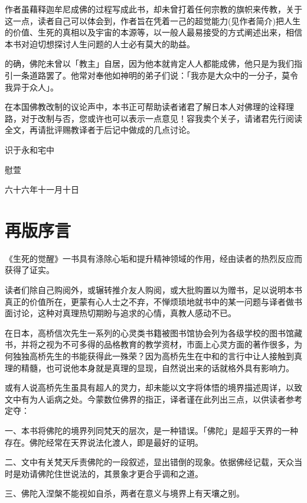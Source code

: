 \documentclass[12pt,twoside,openany]{book}
\begin{document}
作者虽藉释迦牟尼成佛的过程写成此书，却未曾打着任何宗教的旗帜来传教，关于这一点，读者自己可以体会到，作者旨在凭着一己的超觉能力(见作者简介)把人生的价值、生死的真相以及宇宙的本源等，以一般人最易接受的方式阐述出来，相信本书对迫切想探讨人生问题的人士必有莫大的助益。

的确，佛陀未曾以「教主」自居，因为他本就肯定人人都能成佛，他只是为我们指引一条道路罢了。他常对奉他如神明的弟子们说：「我亦是大众中的一分子，莫令我异于众人」。

在本国佛教改制的议论声中，本书正可帮助读者诸君了解日本人对佛理的诠释理路，对于改制与否，您或许也可以表示一点意见！容我卖个关子，请诸君先行阅读全文，再请批评赐教译者于后记中做成的几点讨论。

\begin{flushright}
	识于永和宅中\hspace{.5cm}

慰萱\hspace{1.5cm}

  六十六年十一月十日
\end{flushright}

\chapter*{再版序言}
《生死的觉醒》一书具有涤除心垢和提升精神领域的作用，经由读者的热烈反应而获得了证实。

读者们除自己购阅外，或辗转推介友人购阅，或大批购置以为赠书，足以说明本书真正的价值所在，更蒙有心人士之不弃，不惮烦琐地就书中的某一问题与译者做书面讨论，这种对真理热切期盼与追求的心情，真教人感动不已。

在日本，高桥信次先生一系列的心灵类书籍被图书馆协会列为各级学校的图书馆藏书，并将之视为不可多得的品格教育的教学资材，市面上心灵方面的著作很多，为何独独高桥先生的书能获得此一殊荣？因为高桥先生在中和的言行中让人接触到真理的精髓，也可说他本身就是真理的显现，自然说出来的话就格外具有影响力。

或有人说高桥先生虽具有超人的灵力，却未能以文字将体悟的境界描述周详，以致文中有为人诟病之处。今蒙数位佛界的指正，译者谨在此列出三点，以供读者参考定夺：

一、本书将佛陀的境界列同梵天的层次，是一种错误。「佛陀」是超乎天界的一种存在。佛陀经常在天界说法化渡人，即是最好的证明。

二、文中有关梵天斥责佛陀的一段叙述，显出错倒的现象。依据佛经记载，天众当时是劝请佛陀住世说法的，其景象才更合乎调和之道。

三、佛陀入涅槃不能视如自杀，两者在意义与境界上有天壤之别。
\end{document}
